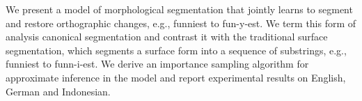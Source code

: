 We present a model of morphological segmentation that jointly learns to segment and restore orthographic changes, e.g., funniest to fun-y-est. We term this form of analysis canonical segmentation and contrast it with the traditional surface segmentation, which segments a surface form into a sequence of substrings, e.g., funniest to funn-i-est. We derive an importance sampling algorithm for approximate inference in the model and report experimental results on English, German and Indonesian.
